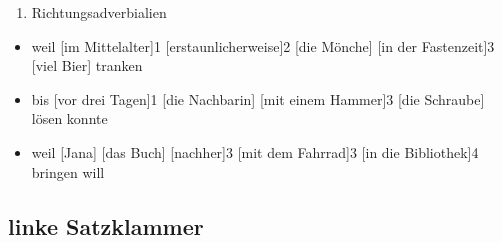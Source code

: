 \documentclass[UTF8]{report}
\begin{document}
\begin{enumerate}
\begin{enumerate}
        \item Richtungsadverbialien
    \end{enumerate}
    \begin{itemize}
        \item weil [im Mittelalter]1 [erstaunlicherweise]2 [die Mönche] [in der Fastenzeit]3 [viel Bier] tranken
        \item bis [vor drei Tagen]1 [die Nachbarin] [mit einem Hammer]3 [die Schraube] lösen konnte
        \item weil [Jana] [das Buch] [nachher]3 [mit dem Fahrrad]3 [in die Bibliothek]4 bringen will
    \end{itemize}
\end{enumerate}


\subsection{linke Satzklammer}
\end{document}
